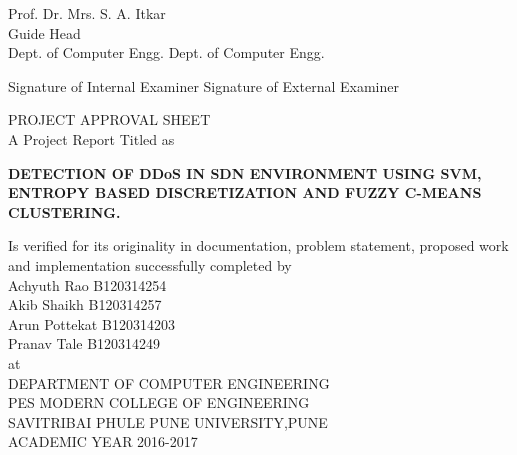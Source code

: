 \documentclass[12pt,a4paper,final]{report}
\begin{document}
Prof. Dr. Mrs. S. A. Itkar \\
\hspace*{2.5cm}
Guide
\hspace{10cm}
Head \\
\hspace*{1cm}
Dept. of Computer Engg.
\hspace{6.4cm}
Dept. of Computer Engg. \\
\begin{minipage}{\textwidth}
\vspace{2cm}
\hspace*{0.7cm}
Signature of Internal Examiner
\hspace{5.5cm}
Signature of External Examiner
\end{minipage}

\newpage
\thispagestyle{empty}
\large
\begin{center}
\vspace*{2cm}
PROJECT APPROVAL SHEET \\
\normalsize
A Project Report Titled as \\ 

\vspace*{2cm}

\Large
\textbf{
DETECTION OF DDoS IN SDN ENVIRONMENT USING SVM,
ENTROPY BASED DISCRETIZATION AND FUZZY C-MEANS
CLUSTERING.
}

\normalsize
\vspace*{3cm}
Is verified for its originality in documentation, problem statement, proposed work and implementation successfully completed by \\ 

\vspace{0.5cm}
Achyuth Rao \hspace*{2.2cm} B120314254 \\
Akib Shaikh \hspace*{2.4cm} B120314257 \\
Arun Pottekat \hspace*{2.2cm} B120314203 \\
Pranav Tale \hspace*{2.5cm} B120314249 \\

\vspace{0.5cm}
at \\
\vspace{0.5cm}
DEPARTMENT OF COMPUTER ENGINEERING \\
\vspace{0.5cm}
PES MODERN COLLEGE OF ENGINEERING \\
\vspace{0.5cm}
SAVITRIBAI PHULE PUNE UNIVERSITY,PUNE \\
\vspace{0.5cm}
ACADEMIC YEAR 2016-2017 \\


\end{center}
\end{document}
